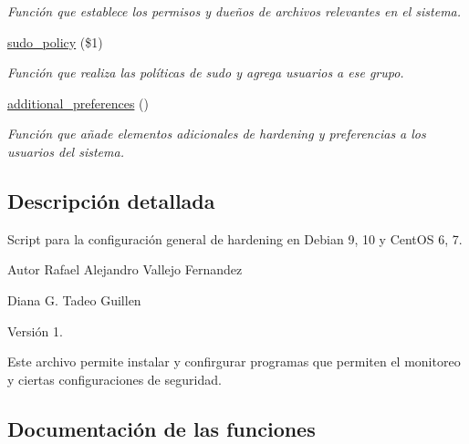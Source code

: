 \begin{DoxyCompactItemize}
\begin{DoxyCompactList}\small\item\em Función que establece los permisos y dueños de archivos relevantes en el sistema. \end{DoxyCompactList}\item 
\hyperlink{Configuraciones__Generales_8sh_a2d14b76d44400f8580c56fd4d74022ae}{sudo\+\_\+policy} (\$1)
\begin{DoxyCompactList}\small\item\em Función que realiza las políticas de sudo y agrega usuarios a ese grupo. \end{DoxyCompactList}\item 
\mbox{\label{Configuraciones__Generales_8sh_a3abca90681740a1a93061f0453bdfccd}} 
\hyperlink{Configuraciones__Generales_8sh_a3abca90681740a1a93061f0453bdfccd}{additional\+\_\+preferences} ()
\begin{DoxyCompactList}\small\item\em Función que añade elementos adicionales de hardening y preferencias a los usuarios del sistema. \end{DoxyCompactList}\end{DoxyCompactItemize}


\subsection{Descripción detallada}
Script para la configuración general de hardening en Debian 9, 10 y Cent\+OS 6, 7. 

\begin{DoxyAuthor}{Autor}
Rafael Alejandro Vallejo Fernandez 

Diana G. Tadeo Guillen 
\end{DoxyAuthor}
\begin{DoxyVersion}{Versión}
1.
\end{DoxyVersion}
Este archivo permite instalar y confirgurar programas que permiten el monitoreo y ciertas configuraciones de seguridad. 

\subsection{Documentación de las funciones}
\mbox{\label{Configuraciones__Generales_8sh_ad83bd5e5089ad1546035126564e2a5d1}} 
